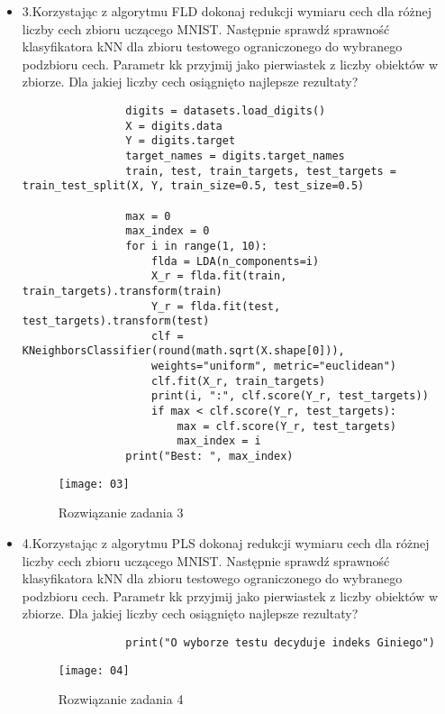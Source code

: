 \documentclass[12pt,a4paper]{article}
\begin{document}
\begin{itemize}
                \item 3.Korzystając z algorytmu FLD dokonaj redukcji wymiaru cech dla różnej liczby cech zbioru uczącego MNIST. Następnie sprawdź sprawność klasyfikatora kNN dla zbioru testowego ograniczonego do wybranego podzbioru cech. Parametr kk przyjmij jako pierwiastek z liczby obiektów w zbiorze. Dla jakiej liczby cech osiągnięto najlepsze rezultaty?
	\begin{lstlisting}
                digits = datasets.load_digits()
                X = digits.data
                Y = digits.target
                target_names = digits.target_names
                train, test, train_targets, test_targets = train_test_split(X, Y, train_size=0.5, test_size=0.5)
                
                max = 0
                max_index = 0
                for i in range(1, 10):
                    flda = LDA(n_components=i)
                    X_r = flda.fit(train, train_targets).transform(train)
                    Y_r = flda.fit(test, test_targets).transform(test)
                    clf = KNeighborsClassifier(round(math.sqrt(X.shape[0])),
                    weights="uniform", metric="euclidean")
                    clf.fit(X_r, train_targets)
                    print(i, ":", clf.score(Y_r, test_targets))
                    if max < clf.score(Y_r, test_targets):
                        max = clf.score(Y_r, test_targets)
                        max_index = i
                print("Best: ", max_index)
	\end{lstlisting}
		\begin{figure}[h]
                        \texttt{[image: 03]}
                        \centering
			\caption{Rozwiązanie zadania 3}
			\label{fig:fig3}
                \end{figure}
                \clearpage

                \item 4.Korzystając z algorytmu PLS dokonaj redukcji wymiaru cech dla różnej liczby cech zbioru uczącego MNIST. Następnie sprawdź sprawność klasyfikatora kNN dla zbioru testowego ograniczonego do wybranego podzbioru cech. Parametr kk przyjmij jako pierwiastek z liczby obiektów w zbiorze. Dla jakiej liczby cech osiągnięto najlepsze rezultaty?
        \begin{lstlisting}
                print("O wyborze testu decyduje indeks Giniego")
	\end{lstlisting}
		\begin{figure}[h]
                        \texttt{[image: 04]}
                        \centering
			\caption{Rozwiązanie zadania 4}
			\label{fig:fig4}
                \end{figure}
                \clearpage


\end{itemize}
\end{document}
